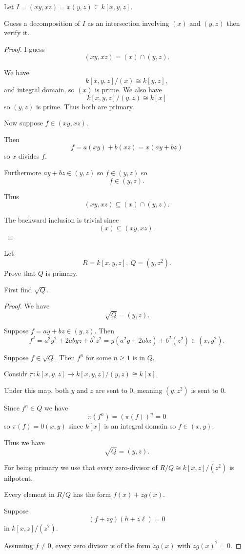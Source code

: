 \documentclass[11pt]{article}
\begin{document}
\begin{prob}
    Let $I = (xy, xz) = x(y,z) \subseteq k[x,y,z]$. 

    Guess a decomposition of $I$ 
    as an intersection involving 
    $(x)$ and $(y,z)$ then verify it. 
\end{prob}
\begin{proof}
    I guess 
    \[
        (xy,xz) = (x) \cap (y,z). 
    \]

    We have 
    \[
        k[x,y,z]/(x) \cong k[y,z],
    \]
    and integral domain, so $(x)$ is prime. 
    We also have 
    \[
        k[x,y,z]/(y,z) \cong k[x]
    \]
    so $(y,z)$ is prime. 
    Thus both are primary. 

    Now suppose $f \in (xy,xz)$. 
    
    Then 
    \[
        f = a(xy) + b(xz) = x(ay+bz)
    \]
    so $x$ divides $f$. 

    Furthermore $ay+bz \in (y,z)$ so 
    $f \in (y,z)$ 
    so 
    \[
        f \in (y,z).
    \]

    Thus 
    \[
        (xy,xz) \subseteq (x) \cap (y,z). 
    \]

    The backward inclusion is trivial since 
    \[
        (x) \subseteq (xy,xz). 
    \]    
\end{proof}

\begin{prob}
    Let 
    \[
        R = k[x,y,z], \ Q = (y,z^2). 
    \]
    Prove that $Q$ is primary. 

    First find $\sqrt Q$. 
\end{prob}
\begin{proof}
    We have 
    \[
        \sqrt Q = (y,z). 
    \]

    Suppose $f = ay + bz \in (y,z)$. 
    Then 
    \[
        f^2 = a^2y^2 + 2abyz + b^2z^2 
        = y(a^2y + 2abz) + b^2(z^2) \in (x,y^2). 
    \]

    Suppose $f \in \sqrt Q$. Then 
    $f^n$ for some $n \geq 1$ is in $Q$. 
    
    Considr $\pi : k[x,y,z] \to k[x,y,z]/(y,z) 
    \cong k[x]$. 

    Under this map, both $y$ and $z$ are 
    sent to $0$, meaning $(y,z^2)$ is sent 
    to $0$. 

    Since $f^n \in Q$ we have 
    \[
        \pi(f^n) = (\pi(f))^n = 0 
    \]
    so $\pi(f) = 0 (x,y)$ since $k[x]$ is an integral domain
    so $f \in (x,y)$.

    Thus we have 
    \[
        \sqrt Q = (y,z). 
    \]

    For being primary 
    we use that every zero-divisor of 
    $R/Q \cong k[x,z]/(z^2)$ is nilpotent. 

    Every element in $R/Q$ has the form 
    $f(x) + zg(x)$. 

    Suppose 
    \[
        (f+zg)(h+z\ell) = 0 
    \]
    in $k[x,z]/(z^2)$. 

    Assuming $f\neq 0$, every 
    zero divisor is of the form $zg(x)$ 
    with $zg(x)^2 = 0$. 
\end{proof}
\end{document}
